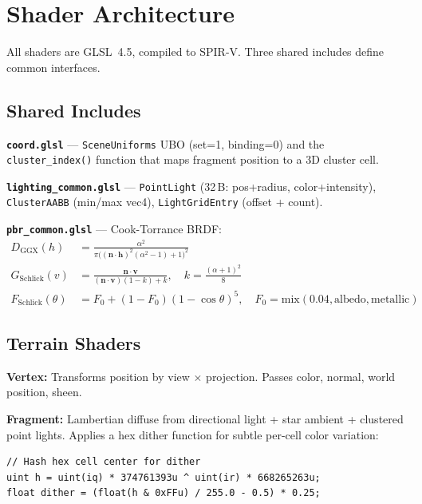 \documentclass[11pt,a4paper]{article}
\begin{document}
\section{Shader Architecture}
\label{sec:shaders}

All shaders are GLSL~4.5, compiled to SPIR-V. Three shared includes define common interfaces.

\subsection{Shared Includes}

\textbf{\texttt{coord.glsl}} --- \texttt{SceneUniforms} UBO (set=1, binding=0) and the \texttt{cluster\_index()} function that maps fragment position to a 3D cluster cell.

\textbf{\texttt{lighting\_common.glsl}} --- \texttt{PointLight} (32\,B: pos+radius, color+intensity), \texttt{ClusterAABB} (min/max vec4), \texttt{LightGridEntry} (offset + count).

\textbf{\texttt{pbr\_common.glsl}} --- Cook-Torrance BRDF:
\begin{align}
  D_\text{GGX}(h) &= \frac{\alpha^2}{\pi\bigl((\mathbf{n}\cdot\mathbf{h})^2(\alpha^2-1)+1\bigr)^2} \\
  G_\text{Schlick}(v) &= \frac{\mathbf{n}\cdot\mathbf{v}}{(\mathbf{n}\cdot\mathbf{v})(1-k)+k}, \quad k = \frac{(\alpha+1)^2}{8} \\
  F_\text{Schlick}(\theta) &= F_0 + (1-F_0)(1-\cos\theta)^5, \quad F_0 = \text{mix}(0.04, \text{albedo}, \text{metallic})
\end{align}

\subsection{Terrain Shaders}

\textbf{Vertex:} Transforms position by view $\times$ projection. Passes color, normal, world position, sheen.

\textbf{Fragment:} Lambertian diffuse from directional light + star ambient + clustered point lights. Applies a hex dither function for subtle per-cell color variation:
\begin{lstlisting}[style=glslstyle,numbers=none]
// Hash hex cell center for dither
uint h = uint(iq) * 374761393u ^ uint(ir) * 668265263u;
float dither = (float(h & 0xFFu) / 255.0 - 0.5) * 0.25;
\end{lstlisting}
\end{document}
